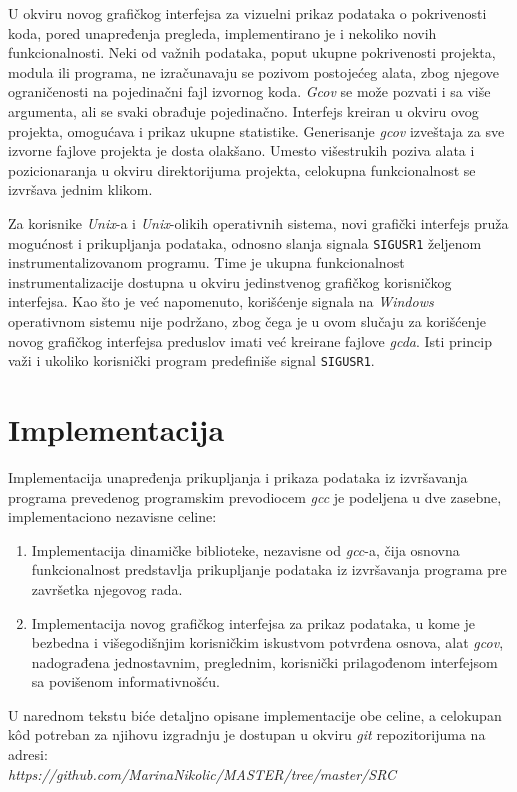 \documentclass[12pt,oneside]{memoir}
\newcommand{\kod}[1]{\texttt{#1}}
\newcommand{\strano}[1]{\textit{#1}}
\begin{document}
U okviru novog grafičkog interfejsa za vizuelni prikaz podataka o pokrivenosti koda, pored unapređenja pregleda, implementirano je i nekoliko novih funkcionalnosti. Neki od važnih podataka, poput ukupne pokrivenosti projekta, modula ili programa, ne izračunavaju se pozivom postojećeg alata, zbog njegove ograničenosti na pojedinačni fajl izvornog koda. \strano{Gcov} se može pozvati i sa više argumenta, ali se svaki obrađuje pojedinačno. Interfejs kreiran u okviru ovog projekta, omogućava i prikaz ukupne statistike. Generisanje \strano{gcov} izveštaja za sve izvorne fajlove projekta je dosta olakšano. Umesto višestrukih poziva alata i pozicionaranja u okviru direktorijuma projekta, celokupna funkcionalnost se izvršava jednim klikom. 

Za korisnike \strano{Unix}-a i \strano{Unix}-olikih operativnih sistema, novi grafički interfejs pruža mogućnost i prikupljanja podataka, odnosno slanja signala \kod{SIGUSR1} željenom instrumentalizovanom programu. Time je ukupna funkcionalnost instrumentalizacije dostupna u okviru jedinstvenog grafičkog korisničkog interfejsa. Kao što je već napomenuto, korišćenje signala na \strano{Windows} operativnom sistemu nije podržano, zbog čega je u ovom slučaju za korišćenje novog grafičkog interfejsa preduslov imati već kreirane fajlove \strano{gcda}. Isti princip važi i ukoliko korisnički program predefiniše signal \kod{SIGUSR1}.

\chapter{Implementacija}
\label{chp:implementacija}

Implementacija unapređenja prikupljanja i prikaza podataka iz izvršavanja programa prevedenog programskim prevodiocem \strano{gcc} je podeljena u dve zasebne, implementaciono nezavisne celine:
\begin{enumerate}
\item Implementacija dinamičke biblioteke, nezavisne od \strano{gcc}-a, čija osnovna funkcionalnost predstavlja prikupljanje podataka iz izvršavanja programa pre završetka njegovog rada.
\item Implementacija novog grafičkog interfejsa za prikaz podataka, u kome je bezbedna i višegodišnjim korisničkim iskustvom potvrđena osnova, alat \strano{gcov}, nadograđena jednostavnim, preglednim, korisnički prilagođenom interfejsom sa povišenom informativnošću.
\end{enumerate}
U narednom tekstu biće detaljno opisane implementacije obe celine, a celokupan k\^{o}d potreban za njihovu izgradnju je dostupan u okviru \strano{git} repozitorijuma na adresi:\\
\strano{https://github.com/MarinaNikolic/MASTER/tree/master/SRC}
\end{document}
